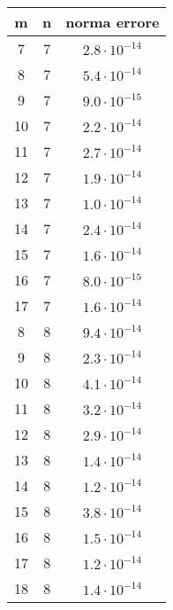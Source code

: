 \documentclass[a4paper]{report}
\begin{document}
\begin{tabular}{|c|c|c|}
   \hline
m&n&norma errore\\ \hline
 7& 7&$2.8\cdot 10^{-14}$\\ \hline
8& 7 &$5.4\cdot 10^{-14}$\\ \hline
9& 7 &$9.0\cdot 10^{-15}$\\ \hline
10& 7&$2.2\cdot 10^{-14}$\\ \hline
11& 7&$2.7\cdot 10^{-14}$\\ \hline
12& 7&$1.9\cdot 10^{-14}$\\ \hline
13& 7&$1.0\cdot 10^{-14}$\\ \hline
14& 7&$2.4\cdot 10^{-14}$\\ \hline
15& 7&$1.6\cdot 10^{-14}$\\ \hline
16& 7&$8.0\cdot 10^{-15}$\\ \hline
17& 7&$1.6\cdot 10^{-14}$\\ \hline
8& 8 &$9.4\cdot 10^{-14}$\\ \hline
9& 8 &$2.3\cdot 10^{-14}$\\ \hline
10& 8&$4.1\cdot 10^{-14}$\\ \hline
11& 8&$3.2\cdot 10^{-14}$\\ \hline
12& 8&$2.9\cdot 10^{-14}$\\ \hline
13& 8&$1.4\cdot 10^{-14}$\\ \hline
14& 8&$1.2\cdot 10^{-14}$\\ \hline
15& 8&$3.8\cdot 10^{-14}$\\ \hline
16& 8&$1.5\cdot 10^{-14}$\\ \hline
17& 8&$1.2\cdot 10^{-14}$\\ \hline
18& 8&$1.4\cdot 10^{-14}$\\ \hline
\end{tabular}
\end{document}
